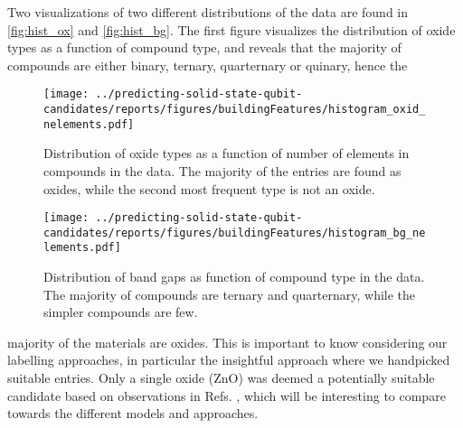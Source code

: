 

Two visualizations of two different distributions of the data are found in \autoref{fig:hist_ox} and \autoref{fig:hist_bg}.
The first figure visualizes the distribution of oxide types as a function of compound type, and reveals that the majority of compounds are either binary, ternary, quarternary or quinary, hence the

\begin{figure}[]
      \centering
      \texttt{[image: ../predicting-solid-state-qubit-candidates/reports/figures/buildingFeatures/histogram\_oxid\_nelements.pdf]}
      \vspace*{-130mm}
      \caption{Distribution of oxide types as a function of number of elements in compounds in the data. The majority of the entries are found as oxides, while the second most frequent type is not an oxide. }
      \label{fig:hist_ox}
\end{figure}

\begin{figure}[]
      \centering
      \texttt{[image: ../predicting-solid-state-qubit-candidates/reports/figures/buildingFeatures/histogram\_bg\_nelements.pdf]}
      \vspace*{-130mm}
      \caption{Distribution of band gaps as function of compound type in the data. The majority of compounds are ternary and quarternary, while the simpler compounds are few.}
      \label{fig:hist_bg}
\end{figure}

\noindent majority of the materials are oxides.
This is important to know considering our labelling approaches, in particular the insightful approach where we handpicked suitable entries.
Only a single oxide (ZnO) was deemed a potentially suitable candidate based on observations in Refs. \cite{Zhang2020, Zheng2014, Morfa2012}, which will be interesting to compare towards the different models and approaches.


